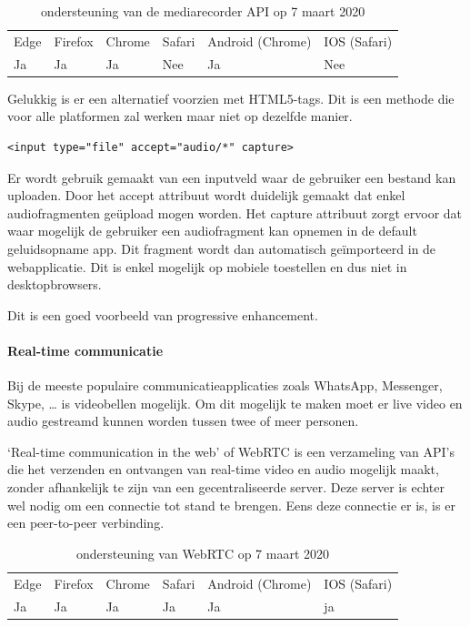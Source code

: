 \begin{table}[H]
	\centering
	\begin{tabular}{llllll}
		Edge & Firefox & Chrome & Safari & Android (Chrome) & IOS (Safari) \\
		Ja   & Ja      & Ja     & Nee     & Ja               & Nee          
	\end{tabular}	
	\caption{ondersteuning van de mediarecorder API op 7 maart 2020}
\end{table}

Gelukkig is er een alternatief voorzien met HTML5-tags. Dit is een methode die voor alle platformen zal werken maar niet op dezelfde manier.

\begin{lstlisting}
<input type="file" accept="audio/*" capture>
\end{lstlisting}

Er wordt gebruik gemaakt van een inputveld waar de gebruiker een bestand kan uploaden. Door het accept attribuut wordt duidelijk gemaakt dat enkel audiofragmenten geüpload mogen worden. Het capture attribuut zorgt ervoor dat waar mogelijk de gebruiker een audiofragment kan opnemen in de default geluidsopname app. Dit fragment wordt dan automatisch geïmporteerd in de webapplicatie. Dit is enkel mogelijk op mobiele toestellen en dus niet in desktopbrowsers.
\autocite{Kinlan2019}

Dit is een goed voorbeeld van progressive enhancement. 



\paragraph{Real-time communicatie }

Bij de meeste populaire communicatieapplicaties zoals WhatsApp, Messenger, Skype, … is videobellen mogelijk. Om dit mogelijk te maken moet er live video en audio gestreamd kunnen worden tussen twee of meer personen.

‘Real-time communication in the web’ of WebRTC \autocite{Jennings2019} is een verzameling van API’s die het verzenden en ontvangen van real-time video en audio mogelijk maakt, zonder afhankelijk te zijn van een gecentraliseerde server. Deze server is echter wel nodig om een connectie tot stand te brengen. Eens deze connectie er is, is er een peer-to-peer verbinding.

\begin{table}[H]
	\centering
	\begin{tabular}{llllll}
		Edge & Firefox & Chrome & Safari & Android (Chrome) & IOS (Safari) \\
		Ja   & Ja      & Ja     & Ja     & Ja               & ja          
	\end{tabular}	
	\caption{ondersteuning van WebRTC op 7 maart 2020}
\end{table}




